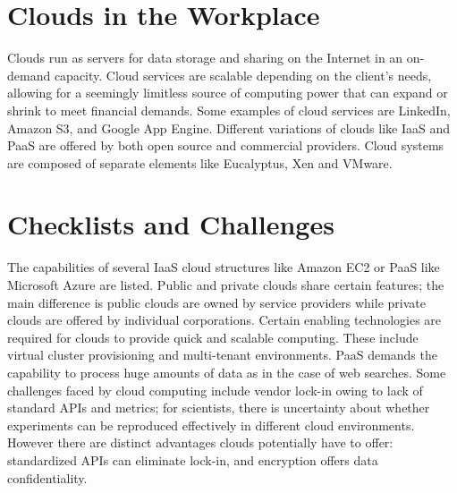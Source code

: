 


\section{Clouds in the Workplace}

Clouds run as servers for data storage and sharing on the Internet in an
on-demand capacity. Cloud services are scalable depending on the
client's needs, allowing for a seemingly limitless source of computing
power that can expand or shrink to meet financial demands. Some examples
of cloud services are LinkedIn, Amazon S3, and Google App Engine.
Different variations of clouds like IaaS and PaaS are offered by both
open source and commercial providers. Cloud systems are composed of
separate elements like Eucalyptus, Xen and VMware.



\section{Checklists and Challenges}

The capabilities of several IaaS cloud structures like Amazon EC2 or
PaaS like Microsoft Azure are listed. Public and private clouds share
certain features; the main difference is public clouds are owned by
service providers while private clouds are offered by individual
corporations. Certain enabling technologies are required for clouds to
provide quick and scalable computing. These include virtual cluster
provisioning and multi-tenant environments. PaaS demands the capability
to process huge amounts of data as in the case of web searches. Some
challenges faced by cloud computing include vendor lock-in owing to lack
of standard APIs and metrics; for scientists, there is uncertainty about
whether experiments can be reproduced effectively in different cloud
environments. However there are distinct advantages clouds potentially
have to offer: standardized APIs can eliminate lock-in, and encryption
offers data confidentiality.


